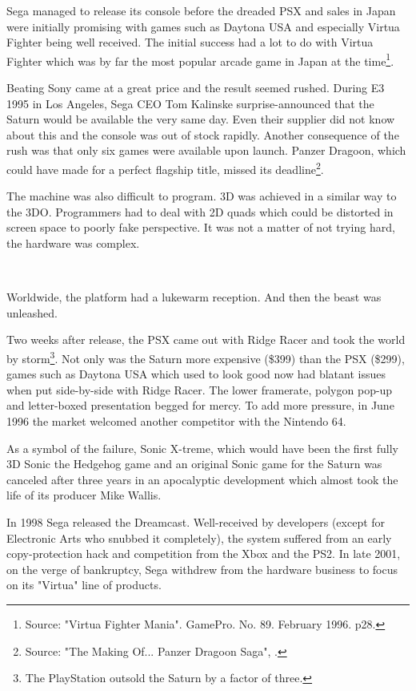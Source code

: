 \vspace{-10pt}
Sega managed to release its console before the dreaded PSX and sales in Japan were initially promising with games such as Daytona USA and especially Virtua Fighter being well received. The initial success had a lot to do with Virtua Fighter which was by far the most popular arcade game in Japan at the time\footnote{Source: "Virtua Fighter Mania". GamePro. No. 89. February 1996.  p28.}.\\
\par
Beating Sony came at a great price and the result seemed rushed. During E3 1995 in Los Angeles, Sega CEO Tom Kalinske surprise-announced that the Saturn would be available the very same day. Even their supplier did not know about this and the console was out of stock rapidly. Another consequence of the rush was that only six games were available upon launch. Panzer Dragoon, which could have made for a perfect flagship title, missed its deadline\footnote{Source: "The Making Of... Panzer Dragoon Saga", .}.\\
\par The machine was also difficult to program. 3D was achieved in a similar way to the 3DO. Programmers had to deal with 2D quads which could be distorted in screen space to poorly fake perspective. It was not a matter of not trying hard, the hardware was complex.\\
\par
{}\\
\par
Worldwide, the platform had a lukewarm reception. And then the beast was unleashed.\\
\par
 Two weeks after release, the PSX came out with Ridge Racer and took the world by storm\footnote{The PlayStation outsold the Saturn by a factor of three.}. Not only was the Saturn more expensive (\$399) than the PSX (\$299), games such as Daytona USA which used to look good now had blatant issues when put side-by-side with Ridge Racer. The lower framerate, polygon pop-up and letter-boxed presentation begged for mercy. To add more pressure, in June 1996 the market welcomed another competitor with the Nintendo 64.\\
\par
As a symbol of the failure, Sonic X-treme, which would have been the first fully 3D Sonic the Hedgehog game and an original Sonic game for the Saturn was canceled after three years in an apocalyptic development which almost took the life of its producer Mike Wallis.\\
\par
In 1998 Sega released the Dreamcast. Well-received by developers (except for Electronic Arts who snubbed it completely), the system suffered from an early copy-protection hack and competition from the Xbox and the PS2. In late 2001, on the verge of bankruptcy, Sega withdrew from the hardware business to focus on its "Virtua" line of products.


